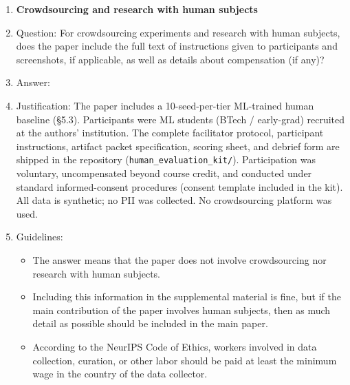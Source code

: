 \begin{enumerate}
\item {\bf Crowdsourcing and research with human subjects}
    \item[] Question: For crowdsourcing experiments and research with human subjects, does the paper include the full text of instructions given to participants and screenshots, if applicable, as well as details about compensation (if any)?
    \item[] Answer: \answerYes{}
    \item[] Justification: The paper includes a 10-seed-per-tier ML-trained human baseline (\S5.3).
    Participants were ML students (BTech / early-grad) recruited at the authors' institution.
    The complete facilitator protocol, participant instructions, artifact packet specification,
    scoring sheet, and debrief form are shipped in the repository
    (\texttt{human\_evaluation\_kit/}).  Participation was voluntary, uncompensated beyond
    course credit, and conducted under standard informed-consent procedures
    (consent template included in the kit).  All data is synthetic; no PII was collected.
    No crowdsourcing platform was used.
    \item[] Guidelines: \begin{itemize}
        \item The answer \answerNA{} means that the paper does not involve crowdsourcing nor research with human subjects.
        \item Including this information in the supplemental material is fine, but if the main contribution of the paper involves human subjects, then as much detail as possible should be included in the main paper.
        \item According to the NeurIPS Code of Ethics, workers involved in data collection, curation, or other labor should be paid at least the minimum wage in the country of the data collector.
    \end{itemize}


\end{enumerate}
